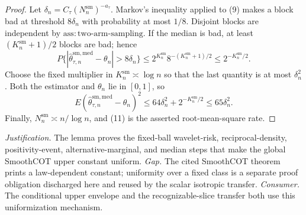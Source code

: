 \documentclass{article}
\begin{document}
\begin{proof}
Let \(\delta_n=C_\tau(N_n^{\mathrm{sm}})^{-a_\tau}\). Markov's inequality applied to (9) makes a block bad at threshold \(8\delta_n\) with probability at most \(1/8\). Disjoint blocks are independent by \(\mathrm{ass{:}two\text{-}arm\text{-}sampling}\). If the median is bad, at least \((K_n^{\mathrm{sm}}+1)/2\) blocks are bad; hence
\[
P\{|\widehat\theta^{\mathrm{sm,med}}_{\tau,n}-\theta_n|>8\delta_n\}
\le2^{K_n^{\mathrm{sm}}}8^{-(K_n^{\mathrm{sm}}+1)/2}
\le2^{-K_n^{\mathrm{sm}}/2}.                                      \tag{10}
\]
Choose the fixed multiplier in \(K_n^{\mathrm{sm}}\asymp\log n\) so that the last quantity is at most \(\delta_n^2\). Both the estimator and \(\theta_n\) lie in \([0,1]\), so
\[
E(\widehat\theta^{\mathrm{sm,med}}_{\tau,n}-\theta_n)^2
\le64\delta_n^2+2^{-K_n^{\mathrm{sm}}/2}
\le65\delta_n^2.                                                   \tag{11}
\]
Finally, \(N_n^{\mathrm{sm}}\asymp n/\log n\), and (11) is the asserted root-mean-square rate.
\end{proof}
\par\smallskip\noindent \textit{Justification.} The lemma proves the fixed-ball wavelet-risk, reciprocal-density, positivity-event, alternative-marginal, and median steps that make the global SmoothCOT upper constant uniform. \textit{Gap.} The cited SmoothCOT theorem prints a law-dependent constant; uniformity over a fixed class is a separate proof obligation discharged here and reused by the scalar isotropic transfer. \textit{Consumer.} The conditional upper envelope and the recognizable-slice transfer both use this uniformization mechanism.
\end{document}
